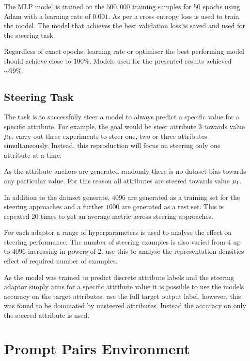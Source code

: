 The MLP model is trained on the $500,000$ training samples for 50 epochs using Adam \citep{adam} with a learning rate of $0.001$.
As per \citet{steering-clear} a cross entropy loss is used to train the model.
The model that achieves the best validation loss is saved and used for the steering task.

Regardless of exact epochs, learning rate or optimiser the best performing model should achieve close to $100\%$.
Models used for the presented results achieved $\sim 99\%$.

\subsection{Steering Task}

The task is to successfully steer a model to always predict a specific value for a specific attribute.
For example, the goal would be steer attribute $3$ towards value $\mathbf{\mu}_1$.
\citet{steering-clear} carry out three experiments to steer one, two or three attributes simultaneously.
Instead, this reproduction will focus on steering only one attribute at a time.

As the attribute anchors are generated randomly there is no dataset bias towards any particular value.
For this reason all attributes are steered towards value $\mathbf{\mu}_1$.

In addition to the dataset generate, $4096$ are generated as a training set for the steering approaches and a further $1000$ are generated as a test set.
This is repeated 20 times to get an average metric across steering approaches.

For each adaptor a range of hyperparameters is used to analyse the effect on steering performance.
The number of steering examples is also varied from $4$ up to $4096$ increasing in powers of $2$.
\citet{steering-clear} use this to analyse the representation densities effect of required number of examples.

 As the model was trained to predict discrete attribute labels and the steering adaptor simply aims for a specific attribute value it is possible to use the models accuracy on the target attributes.
\citet{steering-clear} use the full target output label, however, this was found to be dominated by unsteered attributes.
Instead the accuracy on only the steered attribute is used.

\section{Prompt Pairs Environment}
\label{sec:prompt-pairs}

